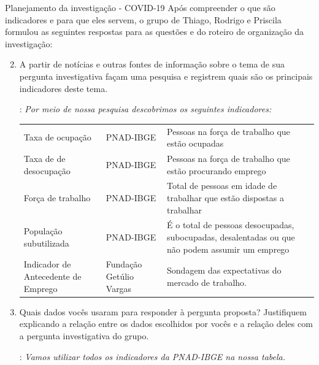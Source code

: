 \begin{example}{Planejamento da investigação - COVID-19}
Após compreender o que são indicadores e para que eles servem, o grupo de Thiago, Rodrigo e Priscila formulou as seguintes respostas para as questões  e  do roteiro de organização da investigação:

\begin{enumerate}[label=\titem{\arabic*)}]\setcounter{enumi}{1}
\item A partir de notícias e outras fontes de informação sobre o tema de sua pergunta investigativa façam uma pesquisa e registrem quais são os principais indicadores deste tema.

: \textit{Por meio de nossa pesquisa descobrimos os seguintes indicadores:}

\begin{table}[H]
\centering

\begin{tabu} to 
\hline
{} &  &  \\
\hline
Taxa de ocupação & PNAD-IBGE & Pessoas na força de trabalho que estão ocupadas \\
\hline
Taxa de de desocupação & PNAD-IBGE & Pessoas na força de trabalho que estão procurando emprego \\
\hline
Força de trabalho & PNAD-IBGE & Total de pessoas em idade de trabalhar que estão dispostas a trabalhar \\
\hline População subutilizada & PNAD-IBGE & É o total de pessoas desocupadas, subocupadas, desalentadas ou que não podem assumir um emprego\\
\hline
Indicador de Antecedente de Emprego & Fundação Getúlio Vargas & Sondagem das expectativas do mercado de trabalho.\\
\hline
\end{tabu}
\end{table}

\item Quais dados vocês usaram para responder à pergunta proposta? Justifiquem explicando a relação entre os dados escolhidos por vocês e a relação deles com a pergunta investigativa do grupo.

: \textit{Vamos utilizar todos os indicadores da PNAD-IBGE na nossa tabela.}
\end{enumerate}
\end{example}

